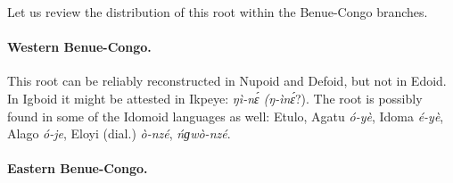 \newpage 
Let us review the distribution of this root within the Benue-Congo branches.

\paragraph*{Western Benue-Congo.}

This root can be reliably reconstructed in Nupoid and Defoid, but not in Edoid. In Igboid it might be attested in Ikpeye: \textit{ŋì-n{\'{ɛ}} (ŋ-ìn{\'{ɛ}}}?). The root is possibly found in some of the Idomoid languages as well: Etulo, Agatu \textit{ó-yè}, Idoma \textit{é-yè}, Alago \textit{ó-je}, Eloyi (dial.) \textit{ò-nzé}, \textit{ńɡwò-nzé}. 

\paragraph*{Eastern Benue-Congo.}

